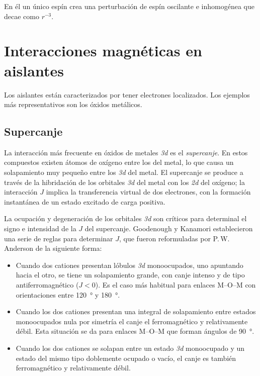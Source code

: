 \documentclass{tufte-book}
\begin{document}
En él un único espín crea una perturbación de espín oscilante e inhomogénea
que decae como $r^{-3}$.



\section{Interacciones magnéticas en aislantes}
Los aislantes están caracterizados por tener electrones localizados.
Los ejemplos más representativos son los óxidos metálicos.

\subsection{Supercanje}
\marginnote{\textcolor{gray}{Go, Jhonny go, go, go, Jhonny B. Goodenough!}}

La interacción más frecuente en óxidos de metales \textit{3d} es el
\emph{supercanje}. En estos compuestos existen átomos de oxígeno entre
los del metal, lo que causa un solapamiento muy pequeño entre los
\textit{3d} del metal. El supercanje se produce a través de la
hibridación de los orbitales \textit{3d} del metal con los \textit{2d}
del oxígeno; la interacción $J$ implica la transferencia virtual de dos
electrones, con la formación instantánea de un estado excitado de
carga positiva.

La ocupación y degeneración de los orbitales \textit{3d} son críticos
para determinal el signo e intensidad de la $J$ del supercanje.
Goodenough y Kanamori establecieron una serie de reglas para
determinar $J$, que fueron reformuladas por P.\,W.\,Anderson de la
siguiente forma:
\begin{itemize}
\item Cuando dos cationes presentan lóbulos \textit{3d} monoocupados,
  uno apuntando hacia el otro, se tiene un solapamiento grande, con
  canje intenso y de tipo antiferromagnético ($J<0$). Es el caso más
  habitual para enlaces M--O--M con orientaciones entre
  \SI{120}{\degree} y \SI{180}{\degree}.
\item Cuando los dos cationes presentan una integral de solapamiento
  entre estados monoocupados nula por simetría el canje el
  ferromagnético y relativamente débil. Esta situación se da para
  enlaces M--O--M que forman ángulos de \SI{90}{\degree}.
\item Cuando los dos cationes se solapan entre un estado \textit{3d}
  monoocupado y un estado del mismo tipo doblemente ocupado o vacío,
  el canje es también ferromagnético y relativamente débil.
\end{itemize}
\end{document}
